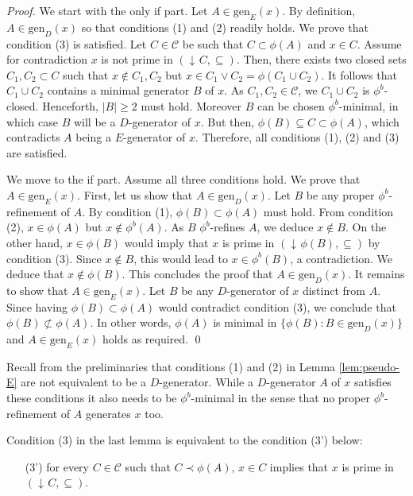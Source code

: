 \documentclass[12pt, a4paper]{article}
\def\arxiv{1}
\newcommand{\cc}[1]{\mathcal{#1}}  %
\newcommand{\st}{:}  %
\newcommand{\card}[1]{\vert #1 \vert}  %
\DeclareMathOperator{\idl}{\downarrow\!}  %
\DeclareMathOperator{\jn}{\lor}  %
\newcommand{\cl}{\phi}  %
\newcommand{\cs}{\cc{C}} %
\newcommand{\gen}{\mathrm{gen}}  %
\begin{document}
\begin{proof}
We start with the only if part.
Let $A \in \gen_E(x)$.
By definition, $A \in \gen_D(x)$ so that conditions (1) and (2) readily holds.
We prove that condition (3) is satisfied.
Let $C \in \cs$ be such that $C \subset \cl(A)$ and $x \in C$.
Assume for contradiction $x$ is not prime in $(\idl C, \subseteq)$.
Then, there exists two closed sets $C_1, C_2 \subset C$ such that $x \notin C_1, C_2$ but $x \in C_1 \jn C_2 = \cl(C_1 \cup C_2)$. 
It follows that $C_1 \cup C_2$ contains a minimal generator $B$ of $x$.
As $C_1, C_2 \in \cs$, we $C_1 \cup C_2$ is $\cl^b$-closed.
Henceforth, $\card{B} \geq 2$ must hold.
Moreover $B$ can be chosen $\cl^b$-minimal, in which case $B$ will be a $D$-generator of $x$.
But then, $\cl(B) \subseteq C \subset \cl(A)$, which contradicts $A$ being a $E$-generator of $x$.
Therefore, all conditions (1), (2) and (3) are satisfied.

We move to the if part.
Assume all three conditions hold.
We prove that $A \in \gen_E(x)$.
First, let us show that $A \in \gen_D(x)$.
Let $B$ be any proper $\cl^b$-refinement of $A$.
By condition (1), $\cl(B) \subset \cl(A)$ must hold.
From condition (2), $x \in \cl(A)$ but $x \notin \cl^b(A)$.
As $B$ $\cl^b$-refines $A$, we deduce $x \notin B$.
On the other hand, $x \in \cl(B)$ would imply that $x$ is prime in $(\idl \cl(B), \subseteq)$ by condition (3).
Since $x \notin B$, this would lead to $x \in \cl^b(B)$, a contradiction.
We deduce that $x \notin \cl(B)$.
This concludes the proof that $A \in \gen_D(x)$.
It remains to show that $A \in \gen_E(x)$.
Let $B$ be any $D$-generator of $x$ distinct from $A$.
Since having $\cl(B) \subset \cl(A)$ would contradict condition (3), we conclude that $\cl(B) \not\subset \cl(A)$.
In other words, $\cl(A)$ is minimal in $\{\cl(B) \st B \in \gen_D(x)\}$ and $A \in \gen_E(x)$ holds as required.
\ifx\arxiv\undefined
\qed
\fi
\end{proof}

\begin{remark}
Recall from the preliminaries that conditions (1) and (2) in Lemma \ref{lem:pseudo-E} are not equivalent to be a $D$-generator.
While a $D$-generator $A$ of $x$ satisfies these conditions it also needs to be $\cl^b$-minimal in the sense that no proper $\cl^b$-refinement of $A$ generates $x$ too. 
\end{remark}

Condition (3) in the last lemma is equivalent to the condition (3') below:
\begin{itemize}
    \item[(3')] for every $C \in \cs$ such that $C \prec \cl(A)$, $x \in C$ implies that $x$ is prime in $(\idl C, \subseteq)$.
\end{itemize}
\end{document}
